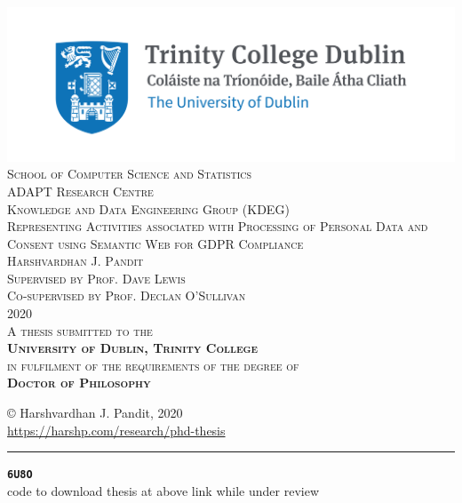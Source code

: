 \pagestyle{empty}
\begin{center}
\scshape
    \includegraphics{img/TCD_logo.png}\\[1cm] 
\large School of Computer Science and Statistics \\[0.25cm]
\small ADAPT Research Centre \\
\small Knowledge and Data Engineering Group (KDEG) \\[1.5cm]

\huge Representing Activities associated with Processing of Personal Data and Consent using Semantic Web for GDPR Compliance \\[1.5cm]
 
\Large Harshvardhan J. Pandit \\[1cm]

\large 
Supervised by Prof. Dave Lewis \\
Co-supervised by Prof. Declan O'Sullivan \\[1cm]

{\small 2020}\\[2cm]

\normalsize
A thesis submitted to the \\
\textbf{University of Dublin, Trinity College} \\
in fulfilment of the requirements of the degree of \\
\textbf{Doctor of Philosophy}

\normalsize

\vfill %
\end{center}
\restoregeometry

\cleardoublepage

\clearpage
\vspace*{\fill}
\begin{center}
    \centering
    \copyright\hspace{0.25cm} Harshvardhan J. Pandit, 2020\\
    \url{https://harshp.com/research/phd-thesis}
    \rule{\textwidth}{1pt}
    \doclicenseThis
    \vspace*{100px}
        \scriptsize \color{gray}
        \textbf{\texttt{6U8O}}\\
        code to download thesis at above link while under review
        \normalsize \color{black}
\end{center}
\vfill
\clearpage

